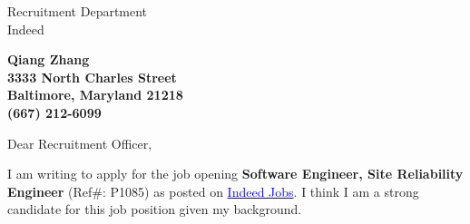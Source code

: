 \documentclass[11pt]{letter} %
\begin{document}

\begin{letter}{Recruitment Department \\
Indeed} 


\begin{center}
\large\bf Qiang Zhang \\ %
3333 North Charles Street \\ Baltimore, Maryland 21218 \\ (667) 212-6099 %
\end{center} 
\vfill

\signature{Qiang Zhang} %


\opening{Dear Recruitment Officer,} 
 

I am writing to apply for the job opening \textbf{Software Engineer, Site Reliability Engineer} (Ref\#: P1085) as posted on \href{https://www.indeed.jobs/career/JobDetail/Software-Engineer-Site-Reliability-Engineer/6619}{\textcolor{blue}{Indeed Jobs}}. I think I am a strong candidate for this job position given my background.



\end{letter}
\end{document}
